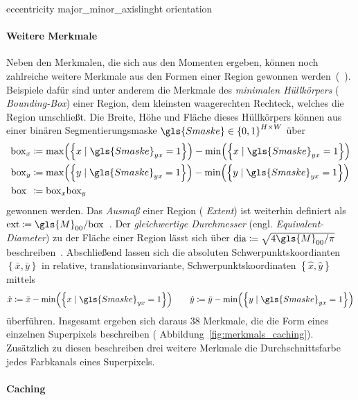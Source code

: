 
\cite{Siedhoff}
eccentricity
major\_minor\_axislinght
orientation

\paragraph{Weitere Merkmale}
\label{weitere_merkmale}

Neben den Merkmalen, die sich aus den Momenten ergeben, können noch zahlreiche weitere Merkmale aus den Formen einer Region gewonnen werden~(\vgl{}~\cite{Siedhoff}).
Beispiele dafür sind unter anderem die Merkmale des \emph{minimalen Hüllkörpers} (\engl{} \emph{Bounding-Box}) einer Region, \dhe{} dem kleinsten waagerechten Rechteck, welches die Region umschließt.
Die Breite, Höhe und Fläche dieses Hüllkörpers können aus einer binären Segmentierungsmaske $\gls{Smaske} \in {\left\{0,1\right\}}^{H \times W}$ über
\begin{equation*}
\begin{split}
  \mathrm{box}_x & \coloneqq \max\left(\left\{x \mid \gls{Smaske}_{yx} = 1\right\}\right) - \min\left(\left\{x \mid \gls{Smaske}_{yx} = 1\right\}\right)\\
  \mathrm{box}_y & \coloneqq \max\left(\left\{y \mid \gls{Smaske}_{yx} = 1\right\}\right) - \min\left(\left\{y \mid \gls{Smaske}_{yx} = 1\right\}\right)\\
  \mathrm{box}_{\,\,\,} & \coloneqq \mathrm{box}_x \mathrm{box}_y
\end{split}
\end{equation*}
gewonnen werden.
Das \emph{Ausmaß} einer Region (\engl{} \emph{Extent}) ist weiterhin definiert als $\mathrm{ext} \coloneqq \gls{M}_{00}/\mathrm{box}$~\cite{Siedhoff}.
Der \emph{gleichwertige Durchmesser} (engl. \emph{Equivalent-Di\-a\-me\-ter}) zu der Fläche einer Region lässt sich über $\mathrm{dia} \coloneqq \sqrt{4 \gls{M}_{00}/\pi}$ beschreiben~\cite{Siedhoff}.
Abschließend lassen sich die absoluten Schwerpunktskoordianten $\left\{\bar{x}, \bar{y}\right\}$ in relative, \dhe{} translationsinvariante, Schwerpunktskoordinaten $\left\{\hat{x}, \hat{y}\right\}$ mittels
\begin{equation*}
  \hat{x} \coloneqq \bar{x} - \min\left(\left\{x \mid \gls{Smaske}_{yx} = 1\right\}\right)
  \qquad
  \hat{y} \coloneqq \bar{y} - \min\left(\left\{y \mid \gls{Smaske}_{yx} = 1\right\}\right)
\end{equation*}
überführen.
Insgesamt ergeben sich daraus $38$ Merkmale, die die Form eines einzelnen Superpixels beschreiben (\vgl{} Abbildung~\ref{fig:merkmals_caching}).
Zusätzlich zu diesen beschreiben drei weitere Merkmale die Durchschnittsfarbe jedes Farbkanals eines Superpixels.

\paragraph{Caching}
\label{Caching}



